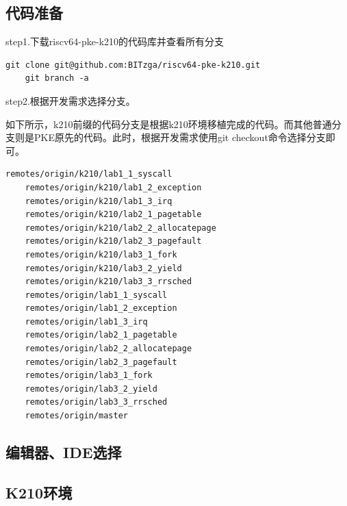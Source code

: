 \subsection{代码准备}

step1.下载riscv64-pke-k210的代码库并查看所有分支

\begin{lstlisting}[caption={下载代码库}, label={lst:download_code}]
    git clone git@github.com:BITzga/riscv64-pke-k210.git
    git branch -a
\end{lstlisting}

step2.根据开发需求选择分支。

如下所示，k210前缀的代码分支是根据k210环境移植完成的代码。而其他普通分支则是PKE原先的代码。此时，根据开发需求使用git checkout命令选择分支即可。

\begin{lstlisting}[caption={分支列表}, label={lst:branch_list}]
    remotes/origin/k210/lab1_1_syscall
    remotes/origin/k210/lab1_2_exception
    remotes/origin/k210/lab1_3_irq
    remotes/origin/k210/lab2_1_pagetable
    remotes/origin/k210/lab2_2_allocatepage
    remotes/origin/k210/lab2_3_pagefault
    remotes/origin/k210/lab3_1_fork
    remotes/origin/k210/lab3_2_yield
    remotes/origin/k210/lab3_3_rrsched
    remotes/origin/lab1_1_syscall
    remotes/origin/lab1_2_exception
    remotes/origin/lab1_3_irq
    remotes/origin/lab2_1_pagetable
    remotes/origin/lab2_2_allocatepage
    remotes/origin/lab2_3_pagefault
    remotes/origin/lab3_1_fork
    remotes/origin/lab3_2_yield
    remotes/origin/lab3_3_rrsched
    remotes/origin/master
\end{lstlisting}


\subsection{编辑器、IDE选择}

\subsection{K210环境}

